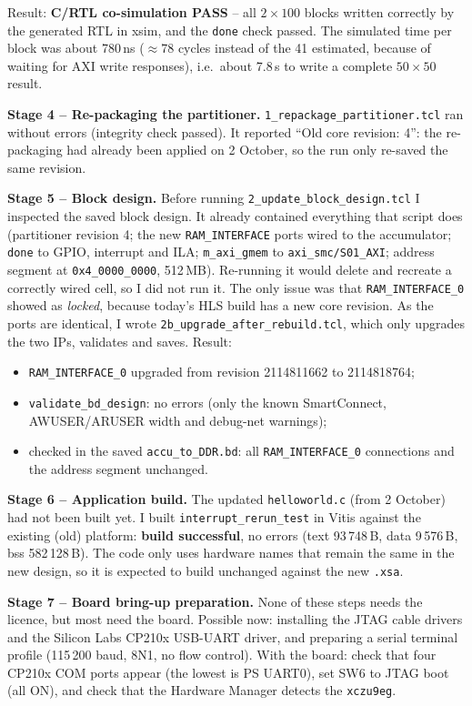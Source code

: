 \documentclass[11pt,a4paper]{article}
\newcommand{\code}[1]{\texttt{#1}}
\begin{document}
Result: \textbf{C/RTL co-simulation PASS} -- all $2\times100$ blocks written correctly by the generated RTL in xsim, and the \code{done} check passed. The simulated time per block was about 780\,ns ($\approx$78 cycles instead of the 41 estimated, because of waiting for AXI write responses), i.e.\ about 7.8\,\textmu s to write a complete $50\times50$ result.

\textbf{Stage 4 -- Re-packaging the partitioner.} \code{1\_repackage\_partitioner.tcl} ran without errors (integrity check passed). It reported ``Old core revision: 4'': the re-packaging had already been applied on 2 October, so the run only re-saved the same revision.

\textbf{Stage 5 -- Block design.} Before running \code{2\_update\_block\_design.tcl} I inspected the saved block design. It already contained everything that script does (partitioner revision 4; the new \code{RAM\_INTERFACE} ports wired to the accumulator; \code{done} to GPIO, interrupt and ILA; \code{m\_axi\_gmem} to \code{axi\_smc/S01\_AXI}; address segment at \code{0x4\_0000\_0000}, 512\,MB). Re-running it would delete and recreate a correctly wired cell, so I did not run it. The only issue was that \code{RAM\_INTERFACE\_0} showed as \emph{locked}, because today's HLS build has a new core revision. As the ports are identical, I wrote \code{2b\_upgrade\_after\_rebuild.tcl}, which only upgrades the two IPs, validates and saves. Result:
\begin{itemize}[noitemsep]
  \item \code{RAM\_INTERFACE\_0} upgraded from revision 2114811662 to 2114818764;
  \item \code{validate\_bd\_design}: no errors (only the known SmartConnect, AWUSER/ARUSER width and debug-net warnings);
  \item checked in the saved \code{accu\_to\_DDR.bd}: all \code{RAM\_INTERFACE\_0} connections and the address segment unchanged.
\end{itemize}

\textbf{Stage 6 -- Application build.} The updated \code{helloworld.c} (from 2 October) had not been built yet. I built \code{interrupt\_rerun\_test} in Vitis against the existing (old) platform: \textbf{build successful}, no errors (text 93\,748\,B, data 9\,576\,B, bss 582\,128\,B). The code only uses hardware names that remain the same in the new design, so it is expected to build unchanged against the new \code{.xsa}.

\textbf{Stage 7 -- Board bring-up preparation.} None of these steps needs the licence, but most need the board. Possible now: installing the JTAG cable drivers and the Silicon Labs CP210x USB-UART driver, and preparing a serial terminal profile (115\,200 baud, 8N1, no flow control). With the board: check that four CP210x COM ports appear (the lowest is PS UART0), set SW6 to JTAG boot (all ON), and check that the Hardware Manager detects the \code{xczu9eg}.
\end{document}
